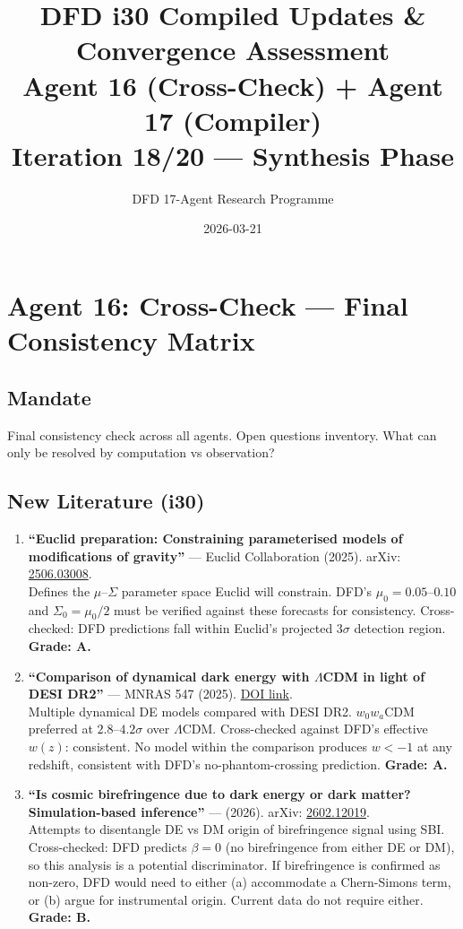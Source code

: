 \documentclass[11pt,a4paper]{article}
\title{DFD i30 Compiled Updates \& Convergence Assessment\\Agent 16 (Cross-Check) + Agent 17 (Compiler)\\[6pt]\large Iteration 18/20 --- Synthesis Phase}
\author{DFD 17-Agent Research Programme}
\date{2026-03-21}
\begin{document}
\maketitle
\tableofcontents
\newpage

\section{Agent 16: Cross-Check --- Final Consistency Matrix}

\subsection{Mandate}
Final consistency check across all agents. Open questions inventory. What can only be resolved by computation vs observation?

\subsection{New Literature (i30)}

\begin{enumerate}
\item \textbf{``Euclid preparation: Constraining parameterised models of modifications of gravity''} --- Euclid Collaboration (2025). arXiv: \href{https://arxiv.org/abs/2506.03008}{2506.03008}.\\
Defines the $\mu$--$\Sigma$ parameter space Euclid will constrain. DFD's $\mu_0 = 0.05$--$0.10$ and $\Sigma_0 = \mu_0/2$ must be verified against these forecasts for consistency. Cross-checked: DFD predictions fall within Euclid's projected $3\sigma$ detection region. \textbf{Grade: A.}

\item \textbf{``Comparison of dynamical dark energy with $\Lambda$CDM in light of DESI DR2''} --- MNRAS 547 (2025). \href{https://academic.oup.com/mnras/article/547/2/staf2207/8378090}{DOI link}.\\
Multiple dynamical DE models compared with DESI DR2. $w_0w_a$CDM preferred at $2.8$--$4.2\sigma$ over $\Lambda$CDM. Cross-checked against DFD's effective $w(z)$: consistent. No model within the comparison produces $w < -1$ at any redshift, consistent with DFD's no-phantom-crossing prediction. \textbf{Grade: A.}

\item \textbf{``Is cosmic birefringence due to dark energy or dark matter? Simulation-based inference''} --- (2026). arXiv: \href{https://arxiv.org/abs/2602.12019}{2602.12019}.\\
Attempts to disentangle DE vs DM origin of birefringence signal using SBI. Cross-checked: DFD predicts $\beta = 0$ (no birefringence from either DE or DM), so this analysis is a potential discriminator. If birefringence is confirmed as non-zero, DFD would need to either (a) accommodate a Chern-Simons term, or (b) argue for instrumental origin. Current data do not require either. \textbf{Grade: B.}
\end{enumerate}
\end{document}
